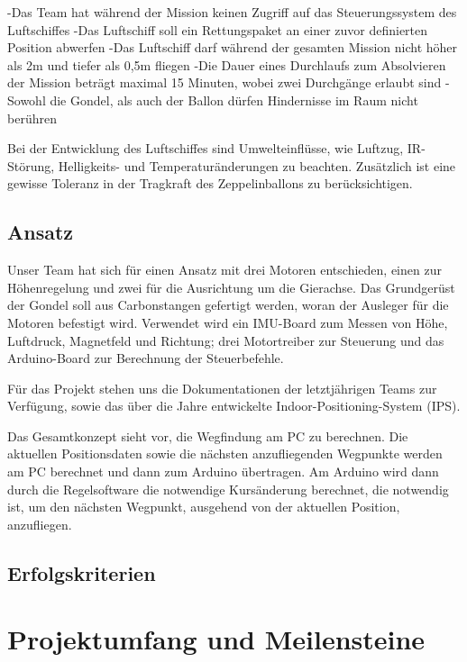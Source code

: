 \documentclass[lang=ngerman,inputenc=utf8,fontsize=10pt]{ldvarticle}
\begin{document}
-Das Team hat während der Mission keinen Zugriff auf das Steuerungssystem des Luftschiffes 
-Das Luftschiff soll ein Rettungspaket an einer zuvor definierten Position abwerfen
-Das Luftschiff darf während der gesamten Mission nicht höher als 2m und tiefer als 0,5m fliegen
-Die Dauer eines Durchlaufs zum Absolvieren der Mission beträgt maximal 15 Minuten, wobei zwei Durchgänge erlaubt sind
-Sowohl die Gondel, als auch der Ballon dürfen Hindernisse im Raum nicht berühren

Bei der Entwicklung des Luftschiffes sind Umwelteinflüsse, wie Luftzug, IR-Störung, Helligkeits- und Temperaturänderungen zu beachten. Zusätzlich ist eine gewisse Toleranz in der Tragkraft des Zeppelinballons zu berücksichtigen.

\subsection*{Ansatz}
Unser Team hat sich für einen Ansatz mit drei Motoren entschieden, einen zur Höhenregelung und zwei für die Ausrichtung um die Gierachse. Das Grundgerüst der Gondel soll aus Carbonstangen gefertigt werden, woran der Ausleger für die Motoren befestigt wird. Verwendet wird ein IMU-Board zum Messen von Höhe, Luftdruck, Magnetfeld und Richtung; drei Motortreiber zur Steuerung und das Arduino-Board zur Berechnung der Steuerbefehle.

Für das Projekt stehen uns die Dokumentationen der letztjährigen Teams zur Verfügung, sowie das über die Jahre entwickelte Indoor-Positioning-System (IPS).

Das Gesamtkonzept sieht vor, die Wegfindung am PC zu berechnen. Die aktuellen Positionsdaten sowie die nächsten anzufliegenden Wegpunkte werden am PC berechnet und dann zum Arduino übertragen. Am Arduino wird dann durch die Regelsoftware die notwendige Kursänderung berechnet, die notwendig ist, um den nächsten Wegpunkt, ausgehend von der aktuellen Position, anzufliegen.
\subsection*{Erfolgskriterien}

\section{Projektumfang und Meilensteine}
\end{document}
